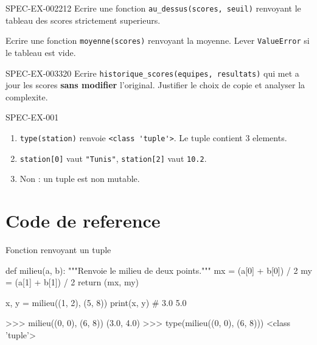 \documentclass{nexus-manuel}
\begin{document}
\begin{exercice}{SPEC-EX-002}{2}{12}
Ecrire une fonction \lstinline{au_dessus(scores, seuil)}
renvoyant le tableau des scores strictement superieurs.

Ecrire une fonction \lstinline{moyenne(scores)} renvoyant
la moyenne. Lever \lstinline{ValueError} si le tableau est vide.
\end{exercice}

\begin{exercice}{SPEC-EX-003}{3}{20}
Ecrire \texttt{historique\_scores(equipes, resultats)}
qui met a jour les scores \textbf{sans modifier} l'original.
Justifier le choix de copie et analyser la complexite.
\end{exercice}

\begin{corrige}{SPEC-EX-001}
\begin{enumerate}
  \item \lstinline{type(station)} renvoie \lstinline{<class 'tuple'>}.
        Le tuple contient 3 elements.

  \item \lstinline{station[0]} vaut \lstinline{"Tunis"},
        \lstinline{station[2]} vaut \lstinline{10.2}.

  \item Non : un tuple est non mutable.
\end{enumerate}
\end{corrige}


\section*{Code de reference}

\begin{codereference}{Fonction renvoyant un tuple}
\begin{python}
def milieu(a, b):
    """Renvoie le milieu de deux points."""
    mx = (a[0] + b[0]) / 2
    my = (a[1] + b[1]) / 2
    return (mx, my)

x, y = milieu((1, 2), (5, 8))
print(x, y)  # 3.0 5.0
\end{python}
\end{codereference}

\begin{console}
>>> milieu((0, 0), (6, 8))
(3.0, 4.0)
>>> type(milieu((0, 0), (6, 8)))
<class 'tuple'>
\end{console}
\end{document}
